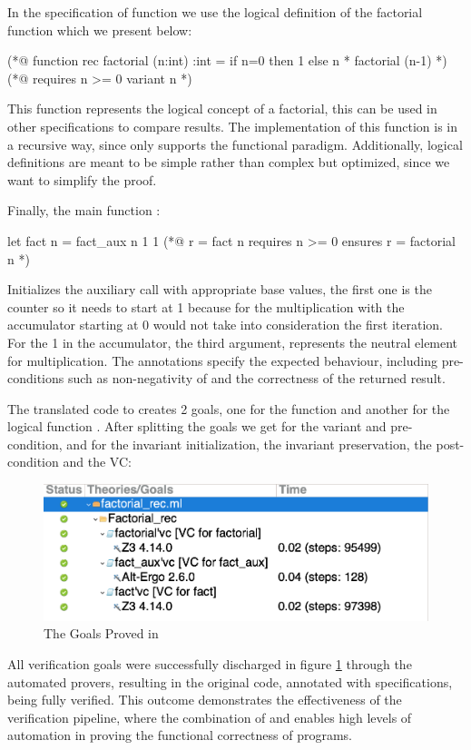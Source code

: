 In the specification of function  we use the logical definition of the factorial function which we present below:

\begin{gospell}
(*@ 
  function rec factorial (n:int) :int = 
    if n=0 then 1 else n * factorial (n-1)
*)
(*@ 
  requires n >= 0
  variant n
*)
\end{gospell}

This \gospel function represents the logical concept of a factorial, this can be used in other specifications 
to compare results. The implementation of this function is in a recursive way, since \gospel only supports the functional paradigm.
Additionally, logical definitions are meant to be simple rather than complex but optimized, since we want to simplify the proof.

Finally, the main function :

\begin{gospell}
let fact n = fact_aux n 1 1
(*@ 
  r = fact n
  requires n >= 0 
  ensures r = factorial n
*)
\end{gospell}

Initializes the auxiliary call with appropriate base values, the first one is the counter so it needs to start at 1 because for the 
multiplication with the accumulator starting at 0 would not take into consideration the first iteration. For the 1 in the accumulator, 
the third argument, represents the neutral element for multiplication. The \gospel annotations specify the expected behaviour, including 
pre-conditions such as non-negativity of  and the correctness of the returned result.

The translated code to \whyml creates 2 goals, one for the function  and another for the logical function
. After splitting the goals we get for  the variant and pre-condition, and for
 the invariant initialization, the invariant preservation, the post-condition and the VC:

\begin{figure}[H]
    \centering
    \includegraphics[width=0.7\linewidth]{images/Why3Goals.png}
    \caption{The Goals Proved in \whythree}
    \label{fig:Why3Goals}
\end{figure}

All verification goals were successfully discharged in figure \ref{fig:Why3Goals} through the automated provers, resulting in the 
original \ocaml code, annotated 
with \gospel specifications, being fully verified. This outcome demonstrates the effectiveness of the verification pipeline, 
where the combination of \cameleer and \whythree enables high levels of automation in proving the functional correctness of 
\ocaml programs.